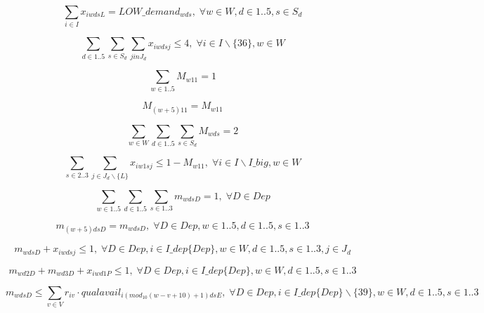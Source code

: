 \begin{equation}
\sum_{i \in I} x_{iwdsL} = LOW\_demand_{wds}, \; \forall w\in W,d\in 1..5,s\in S_d
\end{equation}

\begin{equation}
\sum_{d \in 1..5}\sum_{s \in S_d}\sum_{j in J_d} x_{iwdsj} \leq 4, \; \forall i\in I\backslash\{36\},w\in W
\end{equation}

\begin{equation}
\sum_{w \in 1..5} M_{w11} = 1
\end{equation}

\begin{equation}
M_{(w+5)11} = M_{w11}
\end{equation}

\begin{equation}
\sum_{w \in W}\sum_{d \in 1..5}\sum_{s \in S_d} M_{wds} = 2
\end{equation}

\begin{equation}
\sum_{s \in 2..3}\sum_{j \in J_d\backslash\{L\}} x_{iw1sj} \leq 1-M_{w11}, \; \forall i \in I\backslash I\_big, w \in W
\end{equation}

\begin{equation}
\sum_{w \in 1..5}\sum_{d \in 1..5}\sum_{s \in 1..3} m_{wdsD} = 1, \; \forall D \in Dep
\end{equation}

\begin{equation}
m_{(w+5)dsD} = m_{wdsD}, \; \forall D \in Dep, w \in 1..5, d \in 1..5, s \in 1..3
\end{equation}

\begin{equation}
m_{wdsD} + x_{iwdsj} \leq 1, \; \forall D \in Dep, i \in I\_dep\{Dep\}, w \in W, d \in 1..5, s \in 1..3, j \in J_d
\end{equation}

\begin{equation}
m_{wd2D} + m_{wd3D} + x_{iwd1P} \leq 1, \; \forall D \in Dep, i \in I\_dep\{Dep\}, w \in W, d \in 1..5, s \in 1..3
\end{equation}

\begin{equation}
m_{wdsD} \leq \sum_{v \in V}r_{iv}\cdot qualavail_{i(mod_{10}(w-v+10)+1)dsE}, \; \forall D \in Dep, i \in I\_dep\{Dep\} \backslash \{39\}, w \in W, d \in 1..5, s \in 1..3
\end{equation}


